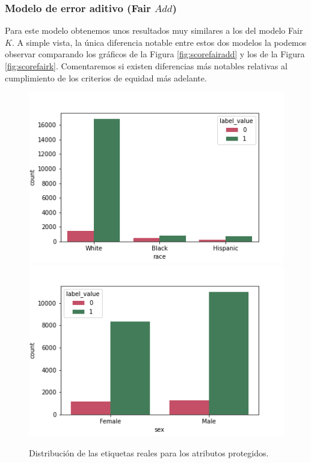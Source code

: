 \documentclass[oneside,openright,titlepage,numbers=noenddot,openany,headinclude,footinclude=true,
cleardoublepage=empty,abstractoff,BCOR=5mm,paper=a4,fontsize=12pt,main=spanish]{scrreprt}
\begin{document}
\subsubsection*{Modelo de error aditivo (Fair $Add$)}

Para este modelo obtenemos unos resultados muy similares a los del modelo Fair $K$. A simple vista, la única diferencia notable entre estos dos modelos la podemos observar comparando los gráficos de la Figura \ref{fig:scorefairadd} y los de la Figura \ref{fig:scorefairk}. Comentaremos si existen diferencias más notables relativas al cumplimiento de los criterios de equidad más adelante.\\

\begin{figure}[h]
      \includegraphics[width=\linewidth]{images/label_race_law_2.png}
    \endminipage\hfill
      \includegraphics[width=\linewidth]{images/label_sex_law_2.png}
    \endminipage
     \caption{Distribución de las etiquetas reales para los atributos protegidos.}
     \label{fig:labelracesex1}
\end{figure}
\end{document}
